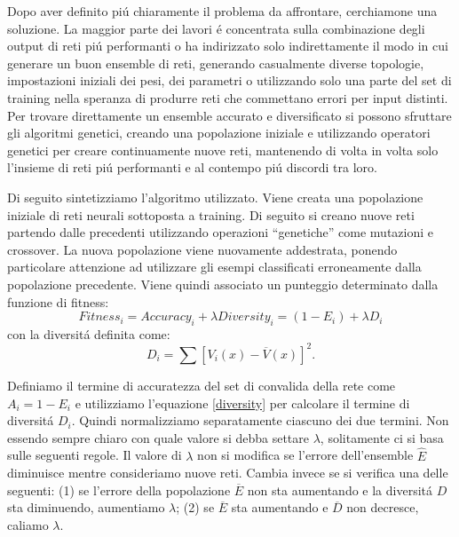 \documentclass[a4paper,12pt]{report}
\begin{document}
  Dopo aver definito pi\'u chiaramente il problema da affrontare, cerchiamone una soluzione. 
  La maggior parte dei lavori \'e concentrata sulla combinazione degli output di reti pi\'u performanti o ha indirizzato solo indirettamente il modo in cui generare un buon ensemble di reti, generando casualmente diverse topologie, impostazioni iniziali dei pesi, dei parametri o utilizzando solo una parte del set di training nella speranza di produrre reti che commettano errori per input distinti. 
  Per trovare direttamente un ensemble accurato e diversificato si possono sfruttare gli algoritmi genetici, creando una popolazione iniziale e utilizzando operatori genetici per creare continuamente nuove reti, mantenendo di volta in volta solo l'insieme di reti pi\'u performanti e al contempo pi\'u discordi tra loro. 

  
  Di seguito sintetizziamo l'algoritmo utilizzato. 
  Viene creata una popolazione iniziale di reti neurali sottoposta a training. 
  Di seguito si creano nuove reti partendo dalle precedenti utilizzando operazioni ``genetiche'' come mutazioni e crossover. 
  La nuova popolazione viene nuovamente addestrata, ponendo particolare attenzione ad utilizzare gli esempi classificati erroneamente dalla popolazione precedente. 
  Viene quindi associato un punteggio determinato dalla funzione di fitness:
  \begin{equation}
   Fitness_i = Accuracy_i + \lambda Diversity_i = (1-E_i) + \lambda D_i \label{fitness}
  \end{equation}
  con la diversit\'a definita come:
  \begin{equation}
   D_i = \sum \left[ V_i \left(x\right) - \overline{V} \left(x\right) \right]^2. \label{diversity}
  \end{equation}
  
  Definiamo il termine di accuratezza del set di convalida della rete come $A_i = 1-E_i$ e utilizziamo l'equazione \ref{diversity} per calcolare il termine di diversit\'a $D_i$. 
  Quindi normalizziamo separatamente ciascuno dei due termini. 
  Non essendo sempre chiaro con quale valore si debba settare $\lambda$, solitamente ci si basa sulle seguenti regole. 
  Il valore di $\lambda$ non si modifica se l'errore dell'ensemble $\widehat{E}$ diminuisce mentre consideriamo nuove reti. 
  Cambia invece se si verifica una delle seguenti: (1) se l'errore della popolazione $\overline{E}$ non sta aumentando e la diversit\'a $D$ sta diminuendo, aumentiamo $\lambda$; (2) se $\overline{E}$ sta aumentando e $\overline{D}$ non decresce, caliamo $\lambda$.
  
\end{document}
